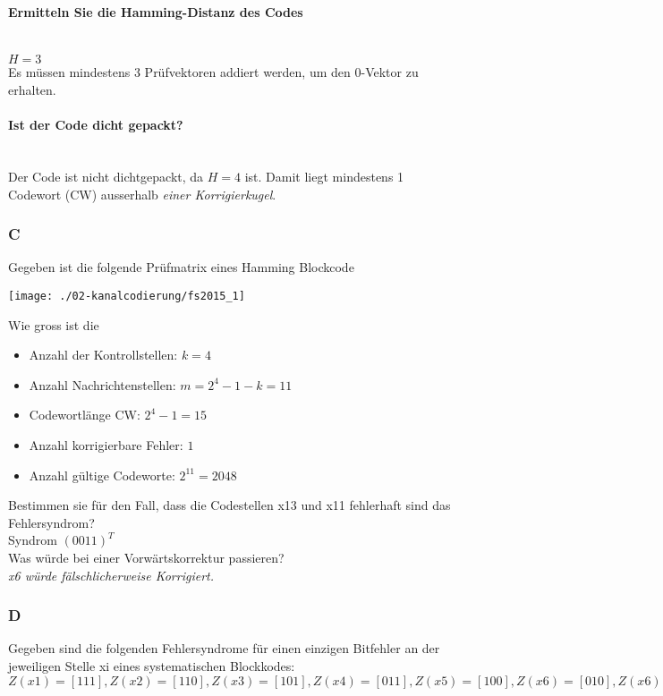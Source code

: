 \paragraph{Ermitteln Sie die Hamming-Distanz des Codes}\mbox{}\\
$H=3$\\
Es müssen mindestens 3 Prüfvektoren addiert werden, um den 0-Vektor zu erhalten.

\paragraph{Ist der Code dicht gepackt?}\mbox{}\\
Der Code ist nicht dichtgepackt, da $H=4$ ist. Damit liegt mindestens 1 Codewort (CW) ausserhalb \textit{einer Korrigierkugel}.

\subsubsection{C}
Gegeben ist die folgende Prüfmatrix eines  Hamming Blockcode
\begin{center}
    \vspace{-8pt}
    \texttt{[image: ./02-kanalcodierung/fs2015\_1]}
    \vspace{-8pt}
\end{center}

Wie gross ist die
\begin{itemize}
    \item Anzahl der Kontrollstellen: $k=4$
    \item Anzahl Nachrichtenstellen: $m=2^4-1-k=11$
    \item Codewortlänge CW: $2^4-1=15$
    \item Anzahl korrigierbare Fehler: $1$
    \item Anzahl gültige Codeworte: $2^11=2048$\\
\end{itemize}

Bestimmen sie für den Fall, dass die Codestellen x13 und x11 fehlerhaft sind das Fehlersyndrom?\\
Syndrom $(0011)^T$\\

Was würde bei einer Vorwärtskorrektur passieren?\\
\textit{x6 würde fälschlicherweise Korrigiert.}

\subsubsection{D}
Gegeben sind die folgenden Fehlersyndrome für einen einzigen Bitfehler an der jeweiligen Stelle xi eines systematischen Blockkodes:\\
$Z(x1)=[111], Z(x2)=[110], Z(x3)=[101], Z(x4)=[011], Z(x5)=[100], Z(x6)=[010], Z(x6)=[001]$\\

